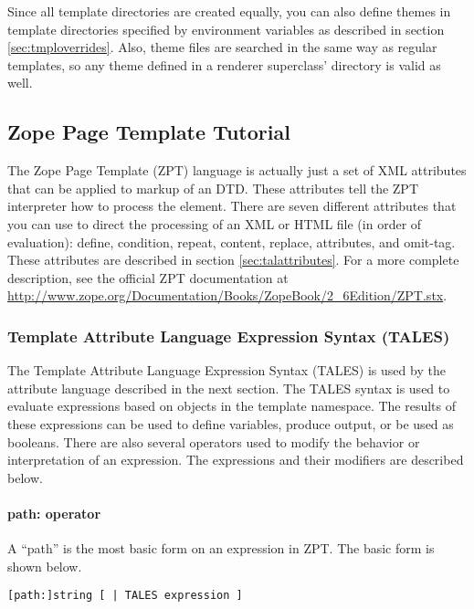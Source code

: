 Since all template directories are created equally, you can also define
themes in template directories specified by environment variables as
described in section \ref{sec:tmploverrides}.  Also, theme files are 
searched in the same way as regular templates, so any theme defined
in a renderer superclass' directory is valid as well.


\subsection{Zope Page Template Tutorial\label{sec:zpttutorial}}

The Zope Page Template (ZPT) language is actually just a set of XML
attributes that can be applied to markup of an DTD.  These attributes
tell the ZPT interpreter how to process the element.  There are 
seven different attributes that you can use to direct the processing
of an XML or HTML file (in order of evaluation): define, condition, repeat, 
content, replace, attributes, and omit-tag.  These attributes are
described in section \ref{sec:talattributes}.  For a more complete description,
see the official ZPT documentation at 
\url{http://www.zope.org/Documentation/Books/ZopeBook/2_6Edition/ZPT.stx}.


\subsubsection{Template Attribute Language Expression Syntax (TALES)}

The Template Attribute Language Expression Syntax (TALES) is used
by the attribute language described in the next section.  The TALES 
syntax is used to evaluate expressions based on objects in the
template namespace.  The results of these expressions can be used to
define variables, produce output, or be used as booleans.  There are
also several operators used to modify the behavior or interpretation
of an expression.  The expressions and their modifiers are described
below.

\paragraph{path: operator\label{sec:pathoperator}}

A ``path'' is the most basic form on an expression in ZPT.  The basic form
is shown below.
\begin{verbatim}
[path:]string [ | TALES expression ]
\end{verbatim}

